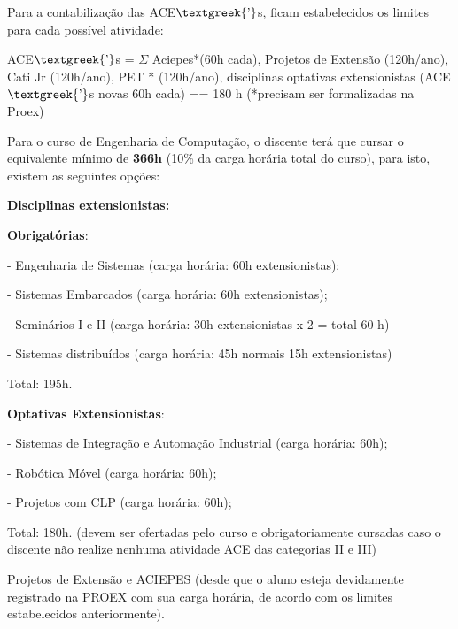 Para a contabilização das ACE$\text{\textgreek{’}}$s, ficam estabelecidos os limites para cada possível atividade:

ACE$\text{\textgreek{’}}$s = $\Sigma $ Aciepes*(60h cada), Projetos de Extensão (120h/ano), Cati Jr (120h/ano), PET%
* (120h/ano), disciplinas optativas extensionistas (ACE$\text{\textgreek{’}}$s novas 60h cada) == 180 h  (*precisam ser formalizadas na Proex)


\bigskip

Para o curso de Engenharia de Computação, o discente terá que cursar o equivalente mínimo de \textbf{366h} (10\% da
carga horária total do curso), para isto, existem as seguintes opções: 


\bigskip

\textbf{Disciplinas extensionistas: }

\textbf{Obrigatórias}:

{}- Engenharia de Sistemas (carga horária: 60h extensionistas);

{}- Sistemas Embarcados (carga horária: 60h extensionistas);

{}- Seminários I e II (carga horária: 30h extensionistas x 2 = total 60 h)

{}- Sistemas distribuídos (carga horária: 45h normais 15h extensionistas)

Total: 195h.


\bigskip

\textbf{Optativas Extensionistas}:

{}- Sistemas de Integração e Automação Industrial (carga horária: 60h);

{}- Robótica Móvel (carga horária: 60h);

{}- Projetos com CLP (carga horária: 60h);


Total: 180h. (devem ser ofertadas pelo curso e obrigatoriamente cursadas caso o discente não realize nenhuma atividade
ACE das categorias II e III)


\bigskip






Projetos de Extensão e ACIEPES (desde que o aluno esteja devidamente registrado na PROEX com sua carga horária, de
acordo com os limites estabelecidos anteriormente).


